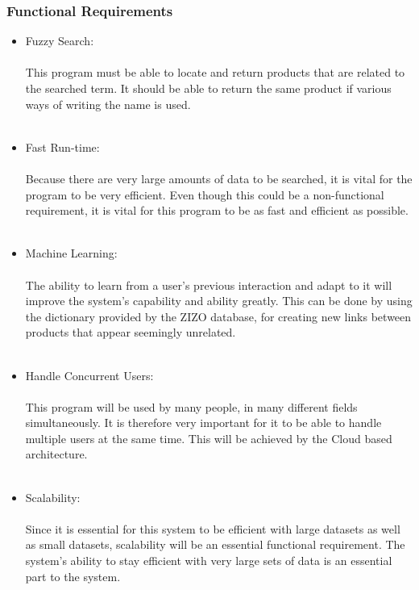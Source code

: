 \documentclass[a4paper,10pt]{article}
\begin{document}
	\subsubsection{Functional Requirements} 
		\begin{itemize}
		\item Fuzzy Search:\\\\
			This program must be able to locate and return products that are related to the searched term. It should be able to return the same product if various ways of writing the name is used.\\\\
	
		\item Fast Run-time:\\\\
			Because there are very large amounts of data to be searched, it is vital for the program to be very efficient.  Even though this could be a non-functional requirement, it is vital for this program to be as fast and efficient as possible.\\\\
			
		\item Machine Learning:\\\\
			The ability to learn from a user's previous interaction and adapt to it will improve the system’s capability and ability greatly. This can be done by using the dictionary provided by the ZIZO database, for creating new links between products that appear seemingly unrelated.\\\\
	
		\item Handle Concurrent Users:\\\\
			This program will be used by many people, in many different fields simultaneously. It is therefore very important for it to be able to handle multiple users at the same time. This will be achieved by the Cloud based architecture.\\\\
	
		\item Scalability:\\\\
			Since it is essential for this system to be efficient with large datasets as well as small datasets, scalability will be an essential functional requirement. The system’s ability to stay efficient with very large sets of data is an essential part to the system.
		 \end{itemize}
\end{document}
